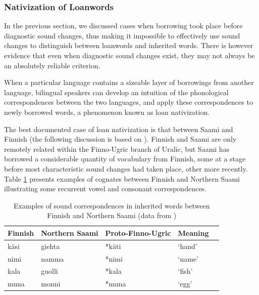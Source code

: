 \documentclass[svgnames,12pt]{scrartcl}
\newcommand{\ipa}[1]{{{\phon\mbox{#1}}}}
\begin{document}
{{\subsubsection{Nativization of Loanwords}
In the previous section, we discussed cases when borrowing took place before diagnostic sound changes, thus making it impossible to effectively use sound changes to distinguish between loanwords and inherited words. There is however evidence that even when diagnostic sound changes exist, they may not always be an absolutely reliable criterion.

When a particular language contains a sizeable layer of borrowings from another language, bilingual speakers can develop an intuition of the phonological correspondences between the two languages, and apply these correspondences to newly borrowed words, a phenomenon known as loan nativization.

The best documented case of loan nativization is that between Saami and Finnish (the following discussion is based on \citealt{aikio06nativization}). Finnish and Saami are only remotely related within the Finno-Ugric branch of Uralic, but  Saami has borrowed a considerable quantity of vocabulary from Finnish, some at a stage before most characteristic sound changes had taken place, other more recently. Table \ref{tab:native} presents examples of cognates between Finnish and Northern Saami illustrating some recurrent vowel and consonant correspondences.

\begin{table}[h]
\caption{Examples of sound correspondences in inherited words between Finnish and Northern Saami (data from \citealt[27]{aikio06nativization})} \centering \label{tab:native}
\begin{tabular}{lllll}
\toprule
Finnish & Northern Saami & Proto-Finno-Ugric & Meaning \\
\midrule
\ipa{käsi} & \ipa{giehta} & *\ipa{käti} & `hand' \\
\ipa{nimi} & \ipa{namma} & *\ipa{nimi} & `name' \\
\ipa{kala} & \ipa{guolli} & *\ipa{kala} & `fish' \\
\ipa{muna} & \ipa{monni} & *\ipa{muna} & `egg' \\
\bottomrule
\end{tabular}
\end{table}

}}
\end{document}
